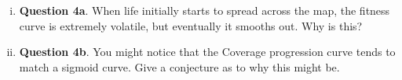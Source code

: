 \documentclass[11pt]{article}
\begin{document}
\begin{problems}
\begin{problem}
\begin{enumerate}[(a)]
        \begin{enumerate}[(i)]
            \item \textbf{Question 4a}. When life initially starts to spread across the map, the fitness curve is extremely volatile, but eventually it smooths out. Why is this?

            \begin{solution}
                
            \end{solution}

            \item \textbf{Question 4b}. You might notice that the Coverage progression curve tends to match a sigmoid curve. Give a conjecture as to why this might be.

            \begin{solution}
                
            \end{solution}
        \end{enumerate}
    \end{enumerate}
    \end{problem}
    \clearpage
    
\end{problems}


\end{document}
